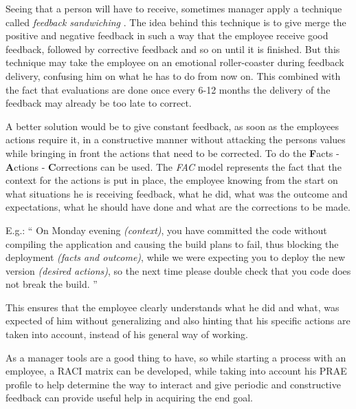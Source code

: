 Seeing that a person will have to receive, sometimes manager apply a technique called \textit{feedback sandwiching} \cite{fbs}. The idea behind this technique is to give merge the positive and negative feedback in such a way that the employee receive good feedback, followed by corrective feedback and so on until it is finished. But this technique may take the employee on an emotional roller-coaster during feedback delivery, confusing him on what he has to do from now on. This combined with the fact that evaluations are done once every 6-12 months the delivery of the feedback may already be too late to correct.

A better solution would be to give constant feedback, as soon as the employees actions require it, in a constructive manner without attacking the persons values while bringing in front the actions that need to be corrected. To do the \textbf{F}acts - \textbf{A}ctions - \textbf{C}orrections can be used. The \textit{FAC} model represents the fact that the context for the actions is put in place, the employee knowing from the start on what situations he is receiving feedback, what he did, what was the outcome and expectations, what he should have done and what are the corrections to be made.

E.g.:
`` On Monday evening \textit{(context)}, you have committed the code without compiling the application and causing the build plans to fail, thus blocking the deployment \textit{(facts and outcome)}, while we were expecting you to deploy the new version \textit{(desired actions)}, so the next time please double check that you code does not break the build. ''

This ensures that the employee clearly understands what he did and what, was expected of him without generalizing and also hinting that his specific actions are taken into account, instead of his general way of working.


As a manager tools are a good thing to have, so while starting a process with an employee, a RACI matrix can be developed, while taking into account his PRAE profile to help determine the way to interact and give periodic and constructive feedback can provide useful help in acquiring the end goal.

